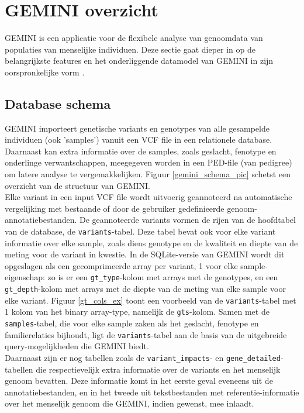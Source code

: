 \chapter{GEMINI overzicht}
\label{gemini_beschrijving}

GEMINI is een applicatie voor de flexibele analyse van genoomdata van populaties van menselijke individuen. Deze sectie gaat dieper in op de belangrijkste features en het onderliggende datamodel van GEMINI in zijn oorspronkelijke vorm \cite{10.1371/journal.pcbi.1003153}\cite{gemini_docs}.

\section{Database schema}

GEMINI importeert genetische variants en genotypes van alle gesampelde individuen (ook 'samples') vanuit een VCF file in een relationele database.
Daarnaast kan extra informatie over de samples, zoals geslacht, fenotype en onderlinge verwantschappen, meegegeven worden in een PED-file (van pedigree) om latere analyse te vergemakkelijken. Figuur \ref{gemini_schema_pic} schetst een overzicht van de structuur van GEMINI.\\

Elke variant in een input VCF file wordt uitvoerig geannoteerd na automatische vergelijking met bestaande of door de gebruiker gedefinieerde genoom-annotatiebestanden. De geannoteerde variants vormen de rijen van de hoofdtabel van de database, de \texttt{variants}-tabel. Deze tabel bevat ook voor elke variant informatie over elke sample, zoals diens genotype en de kwaliteit en diepte van de meting voor de variant in kwestie. In de SQLite-versie van GEMINI wordt dit opgeslagen als een gecomprimeerde array per variant, 1 voor elke sample-eigenschap: zo is er een \texttt{gt\_type}-kolom met arrays met de genotypes, en een \texttt{gt\_depth}-kolom met arrays met de diepte van de meting van elke sample voor elke variant. Figuur \ref{gt_cols_ex} toont een voorbeeld van de \texttt{variants}-tabel met 1 kolom van het binary array-type, namelijk de \texttt{gts}-kolom. Samen met de \texttt{samples}-tabel, die voor elke sample zaken als het geslacht, fenotype en familierelaties bijhoudt, ligt de \texttt{variants}-tabel aan de basis van de uitgebreide query-mogelijkheden die GEMINI biedt.\\
Daarnaast zijn er nog tabellen zoals de \texttt{variant\_impacts}- en \texttt{gene\_detailed}-tabellen die respectievelijk extra informatie over de variants en het menselijk genoom bevatten. Deze informatie komt in het eerste geval eveneens uit de annotatiebestanden, en in het tweede uit tekstbestanden met referentie-informatie over het menselijk genoom die GEMINI, indien gewenst, mee inlaadt.\\

